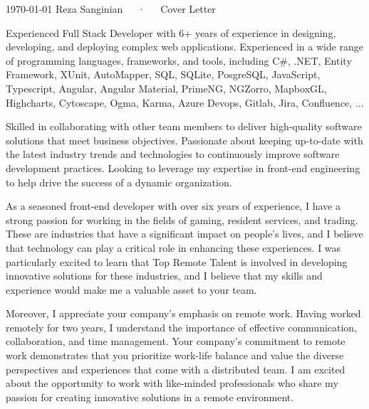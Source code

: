 \documentclass[11pt, a4paper]{awesome-cv}
\begin{document}
\makecvheader[R]

\makecvfooter
  {\today}
  {Reza Sanginian~~~·~~~Cover Letter}
  {}

\makelettertitle

\begin{cvletter}

Experienced Full Stack Developer with 6+ years of experience in designing, developing, and deploying complex web applications. Experienced in a
wide range of programming languages, frameworks, and tools, including C#, .NET, Entity Framework, XUnit, AutoMapper, SQL, SQLite, PosgreSQL,
JavaScript, Typescript, Angular, Angular Material, PrimeNG, NGZorro, MapboxGL, Highcharts, Cytoscape, Ogma, Karma, Azure Devops, Gitlab, Jira,
Confluence, ...

Skilled in collaborating with other team members to deliver high-quality software solutions that meet business objectives. Passionate about
keeping up-to-date with the latest industry trends and technologies to continuously improve software development practices. Looking to leverage
my expertise in front-end engineering to help drive the success of a dynamic organization.

As a seasoned front-end developer with over six years of experience, I have a strong passion for working in the fields of gaming, resident services, and trading. These are industries that have a significant impact on people's lives, and I believe that technology can play a critical role in enhancing these experiences. I was particularly excited to learn that Top Remote Talent is involved in developing innovative solutions for these industries, and I believe that my skills and experience would make me a valuable asset to your team.

Moreover, I appreciate your company's emphasis on remote work. Having worked remotely for two years, I understand the importance of effective communication, collaboration, and time management. Your company's commitment to remote work demonstrates that you prioritize work-life balance and value the diverse perspectives and experiences that come with a distributed team. I am excited about the opportunity to work with like-minded professionals who share my passion for creating innovative solutions in a remote environment.


\end{cvletter}
\end{document}
